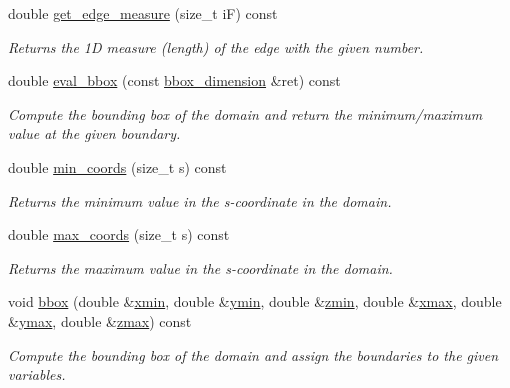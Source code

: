 \begin{DoxyCompactItemize}
double \hyperlink{classStemMesh3D_1_1mesh__3Dv_a003b3bf1a525c821bfb5bb5cf666d3fe}{get\+\_\+edge\+\_\+measure} (size\+\_\+t iF) const
\begin{DoxyCompactList}\small\item\em Returns the 1D measure (length) of the edge with the given number. \end{DoxyCompactList}\item 
double \hyperlink{classStemMesh3D_1_1mesh__3Dv_a4f4fbb68bc50a56fab817fa3ddaf33c2}{eval\+\_\+bbox} (const \hyperlink{classStemMesh3D_1_1mesh__3Dv_a550002922df52cb0711f6d0da2398d6b}{bbox\+\_\+dimension} \&ret) const
\begin{DoxyCompactList}\small\item\em Compute the bounding box of the domain and return the minimum/maximum value at the given boundary. \end{DoxyCompactList}\item 
double \hyperlink{classStemMesh3D_1_1mesh__3Dv_a11dee62c0eab3cb5e37f81807c98c964}{min\+\_\+coords} (size\+\_\+t s) const
\begin{DoxyCompactList}\small\item\em Returns the minimum value in the s-\/coordinate in the domain. \end{DoxyCompactList}\item 
double \hyperlink{classStemMesh3D_1_1mesh__3Dv_a3290b6cc7656e81ccb9ffa0da954755d}{max\+\_\+coords} (size\+\_\+t s) const
\begin{DoxyCompactList}\small\item\em Returns the maximum value in the s-\/coordinate in the domain. \end{DoxyCompactList}\item 
void \hyperlink{classStemMesh3D_1_1mesh__3Dv_abcf7917eb8a7c6598e258b55a618f3e5}{bbox} (double \&\hyperlink{classStemMesh3D_1_1mesh__3Dv_a3d36f7cff6f6006ab50287eb7ecfffe8}{xmin}, double \&\hyperlink{classStemMesh3D_1_1mesh__3Dv_aa3db572deb15fb732eee5c36ebf4a3ac}{ymin}, double \&\hyperlink{classStemMesh3D_1_1mesh__3Dv_a8a9c427682879aa08eff74e9a311af88}{zmin}, double \&\hyperlink{classStemMesh3D_1_1mesh__3Dv_a742de5662e4e8f9acb3db49e30464b2d}{xmax}, double \&\hyperlink{classStemMesh3D_1_1mesh__3Dv_aabed6131430e047c4f38f3db6fbafaf1}{ymax}, double \&\hyperlink{classStemMesh3D_1_1mesh__3Dv_add032c1260324e57f35537ebf59b5815}{zmax}) const
\begin{DoxyCompactList}\small\item\em Compute the bounding box of the domain and assign the boundaries to the given variables. \end{DoxyCompactList}\item 

\end{DoxyCompactItemize}
